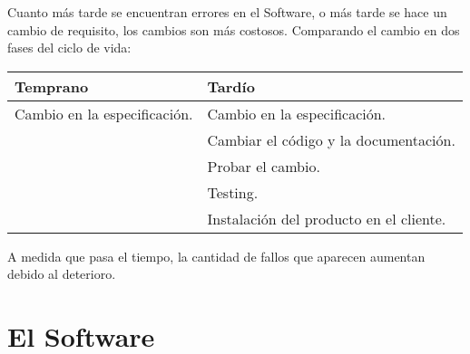 \begin{figure}[h]
  \label{fig:costemetodologia}
\end{figure}

Cuanto más tarde se encuentran errores en el Software, o más tarde se
hace un cambio de requisito, los cambios son más costosos. Comparando
el cambio en dos fases del ciclo de vida:

\begin{center}
\begin{tabular}{p{5cm} | p{7cm}}
  \textbf{Temprano} &   \textbf{Tardío} \\ \hline
  Cambio en la especificación. & Cambio en la especificación. \\
                    & Cambiar el código y la documentación. \\
                    & Probar el cambio. \\
                    & Testing. \\
                    & Instalación del producto en el cliente.

\end{tabular}
\end{center}

A medida que pasa el tiempo, la cantidad de fallos que aparecen
aumentan debido al deterioro.

\section{El Software}
\label{sec:software}


